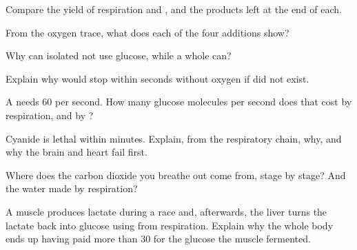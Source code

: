 \begin{exercise}[$\star$]\label{exo:g12:respiration-fermentation:5}
Compare the  yield of respiration and , and the
products left at the end of each.
\end{exercise}

\begin{exercise}[$\star\star$]\label{exo:g12:respiration-fermentation:6}
From the oxygen trace, what does each of the four additions show?
\end{exercise}

\begin{exercise}[$\star\star$]\label{exo:g12:respiration-fermentation:7}
Why can isolated  not use glucose, while a whole  can?
\end{exercise}

\begin{exercise}[$\star\star$]\label{exo:g12:respiration-fermentation:8}
Explain why  would stop within seconds without oxygen if
 did not exist.
\end{exercise}

\begin{exercise}[$\star\star$]\label{exo:g12:respiration-fermentation:9}
A  needs 60  per second. How many glucose molecules per second
does that cost by respiration, and by ?
\end{exercise}

\begin{exercise}[$\star\star$]\label{exo:g12:respiration-fermentation:10}
Cyanide is lethal within minutes. Explain, from the respiratory
chain, why, and why the brain and heart fail first.
\end{exercise}

\begin{exercise}[$\star\star$]\label{exo:g12:respiration-fermentation:11}
Where does the carbon dioxide you breathe out come from, stage by
stage? And the water made by respiration?
\end{exercise}

\begin{exercise}[$\star\star\star$]\label{exo:g12:respiration-fermentation:12}
A muscle produces lactate during a race and, afterwards, the liver
turns the lactate back into glucose using  from respiration.
Explain why the whole body ends up having paid more than 30  for
the glucose the muscle fermented.
\end{exercise}

